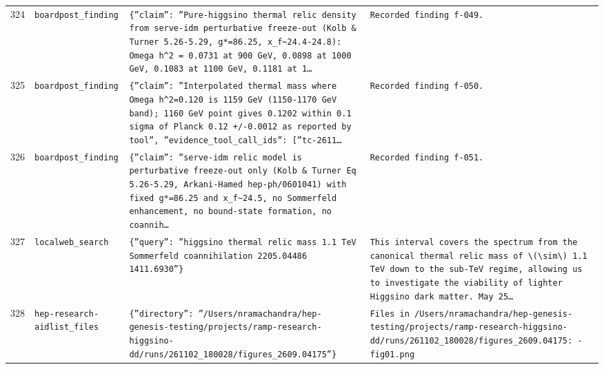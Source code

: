 \documentclass[11pt,a4paper]{article}
\begin{document}
\begin{longtable}{@{}p{}p{}p{}p{}@{}}
324 & \texttt{board}\newline\texttt{post\_\allowbreak{}finding} & \texttt{\{''claim'':\allowbreak{} ''Pure-higgsino thermal relic density from serve-idm perturbative freeze-out (Kolb \& Turner 5.26-5.29,\allowbreak{} g*=\allowbreak{}86.25,\allowbreak{} x\_\allowbreak{}f\textasciitilde{}\allowbreak{}24.4-24.8)\allowbreak{}:\allowbreak{} Omega h\textasciicircum{}\allowbreak{}2 =\allowbreak{} 0.0731 at 900 GeV,\allowbreak{} 0.0898 at 1000 GeV,\allowbreak{} 0.1083 at 1100 GeV,\allowbreak{} 0.1181 at 1\ldots{}\allowbreak{}} & \texttt{Recorded finding f-049.} \\
325 & \texttt{board}\newline\texttt{post\_\allowbreak{}finding} & \texttt{\{''claim'':\allowbreak{} ''Interpolated thermal mass where Omega h\textasciicircum{}\allowbreak{}2=\allowbreak{}0.120 is 1159 GeV (1150-1170 GeV band)\allowbreak{};\allowbreak{} 1160 GeV point gives 0.1202 within 0.1 sigma of Planck 0.12 +/\allowbreak{}-0.0012 as reported by tool'',\allowbreak{} ''evidence\_\allowbreak{}tool\_\allowbreak{}call\_\allowbreak{}ids'':\allowbreak{} [''tc-2611\ldots{}\allowbreak{}} & \texttt{Recorded finding f-050.} \\
326 & \texttt{board}\newline\texttt{post\_\allowbreak{}finding} & \texttt{\{''claim'':\allowbreak{} ''serve-idm relic model is perturbative freeze-out only (Kolb \& Turner Eq 5.26-5.29,\allowbreak{} Arkani-Hamed hep-ph/\allowbreak{}0601041)\allowbreak{} with fixed g*=\allowbreak{}86.25 and x\_\allowbreak{}f\textasciitilde{}\allowbreak{}24.5,\allowbreak{} no Sommerfeld enhancement,\allowbreak{} no bound-state formation,\allowbreak{} no coannih\ldots{}\allowbreak{}} & \texttt{Recorded finding f-051.} \\
327 & \texttt{local}\newline\texttt{web\_\allowbreak{}search} & \texttt{\{''query'':\allowbreak{} ''higgsino thermal relic mass 1.1 TeV Sommerfeld coannihilation 2205.04486 1411.6930''\}\allowbreak{}} & \texttt{This interval covers the spectrum from the canonical thermal relic mass of \textbackslash{}\allowbreak{}(\textbackslash{}\allowbreak{}sim\textbackslash{}\allowbreak{})\allowbreak{} 1.1 TeV down to the sub-TeV regime,\allowbreak{} allowing us to investigate the viability of lighter Higgsino dark matter. May 25\ldots{}\allowbreak{}} \\
328 & \texttt{hep-research-aid}\newline\texttt{list\_\allowbreak{}files} & \texttt{\{''directory'':\allowbreak{} ''/\allowbreak{}Users/\allowbreak{}nramachandra/\allowbreak{}hep-genesis-testing/\allowbreak{}projects/\allowbreak{}ramp-research-higgsino-dd/\allowbreak{}runs/\allowbreak{}261102\_\allowbreak{}180028/\allowbreak{}figures\_\allowbreak{}2609.04175''\}\allowbreak{}} & \texttt{Files in /\allowbreak{}Users/\allowbreak{}nramachandra/\allowbreak{}hep-genesis-testing/\allowbreak{}projects/\allowbreak{}ramp-research-higgsino-dd/\allowbreak{}runs/\allowbreak{}261102\_\allowbreak{}180028/\allowbreak{}figures\_\allowbreak{}2609.04175:\allowbreak{}   - fig01.png} \\

\end{longtable}
\end{document}
